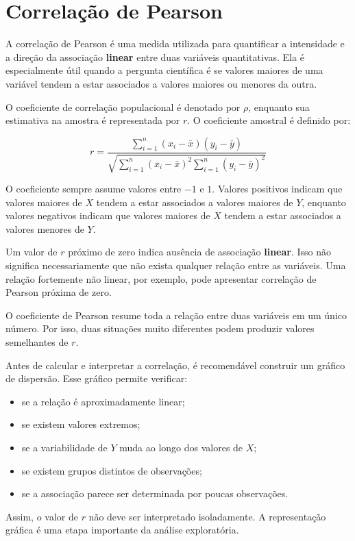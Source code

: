 \section{Correlação de Pearson}

A correlação de Pearson é uma medida utilizada para quantificar a intensidade
e a direção da associação \textbf{linear} entre duas variáveis quantitativas.
Ela é especialmente útil quando a pergunta científica é se valores maiores
de uma variável tendem a estar associados a valores maiores ou menores da
outra.

O coeficiente de correlação populacional é denotado por $\rho$, enquanto sua
estimativa na amostra é representada por $r$. O coeficiente amostral é
definido por:

\begin{equation}
  r=
\frac{
\displaystyle\sum_{i=1}^{n}
(x_i-\bar{x})(y_i-\bar{y})
}{
\sqrt{
\displaystyle\sum_{i=1}^{n}(x_i-\bar{x})^2
\displaystyle\sum_{i=1}^{n}(y_i-\bar{y})^2
}
}
\end{equation}

O coeficiente sempre assume valores entre $-1$ e $1$. Valores positivos indicam que valores maiores de $X$ tendem a estar associados
a valores maiores de $Y$, enquanto valores negativos indicam que valores
maiores de $X$ tendem a estar associados a valores menores de $Y$.

Um valor de $r$ próximo de zero indica ausência de associação \textbf{linear}. Isso não significa necessariamente que não exista qualquer relação entre as variáveis. Uma relação fortemente não linear, por exemplo, pode apresentar correlação de Pearson próxima de zero.

\begin{deepdive}

O coeficiente de Pearson resume toda a relação entre duas variáveis em um
único número. Por isso, duas situações muito diferentes podem produzir
valores semelhantes de $r$.

Antes de calcular e interpretar a correlação, é recomendável construir um
gráfico de dispersão. Esse gráfico permite verificar:

\begin{itemize}
    \item se a relação é aproximadamente linear;
    \item se existem valores extremos;
    \item se a variabilidade de $Y$ muda ao longo dos valores de $X$;
    \item se existem grupos distintos de observações;
    \item se a associação parece ser determinada por poucas observações.
\end{itemize}

Assim, o valor de $r$ não deve ser interpretado isoladamente. A representação
gráfica é uma etapa importante da análise exploratória.
\end{deepdive}

